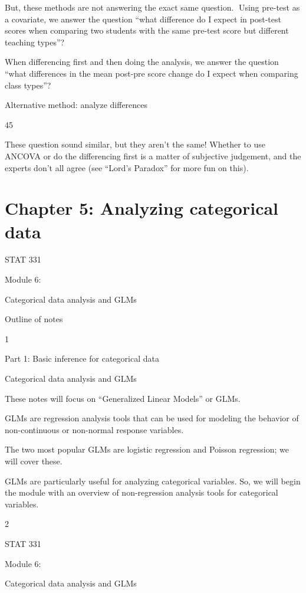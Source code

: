 \documentclass[
  letterpaper,
  DIV=11,
  numbers=noendperiod]{scrreprt}
\begin{document}
But, these methods are not answering the exact same question. Using
pre-test as a covariate, we answer the question ``what difference do I
expect in post-test scores when comparing two students with the same
pre-test score but different teaching types''?

When differencing first and then doing the analysis, we answer the
question ``what differences in the mean post-pre score change do I
expect when comparing class types''?

Alternative method: analyze differences

45

These question sound similar, but they aren't the same! Whether to use
ANCOVA or do the differencing first is a matter of subjective judgement,
and the experts don't all agree (see ``Lord's Paradox'' for more fun on
this).


\hypertarget{chapter-5-analyzing-categorical-data}{%
\chapter{Chapter 5: Analyzing categorical
data}\label{chapter-5-analyzing-categorical-data}}

STAT 331

Module 6:

Categorical data analysis and GLMs

Outline of notes

1

Part 1: Basic inference for categorical data

Categorical data analysis and GLMs

These notes will focus on ``Generalized Linear Models'' or GLMs.

GLMs are regression analysis tools that can be used for modeling the
behavior of non-continuous or non-normal response variables.

The two most popular GLMs are logistic regression and Poisson
regression; we will cover these.

GLMs are particularly useful for analyzing categorical variables. So, we
will begin the module with an overview of non-regression analysis tools
for categorical variables.

2

STAT 331

Module 6:

Categorical data analysis and GLMs
\end{document}

